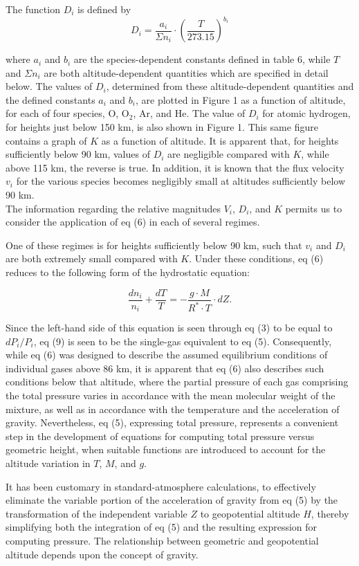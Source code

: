 \documentclass{article}
\begin{document}
The function $D_i$ is defined by
\[
D_i = \frac{a_i}{\Sigma n_i} \cdot \left(\frac{T}{273.15}\right)^{b_i} \tag{8}
\]

where $a_i$ and $b_i$ are the species-dependent constants defined in table 6, while $T$ and $\Sigma n_i$ are both altitude-dependent quantities which are specified in detail below. The values of $D_i$, determined from these altitude-dependent quantities and the defined constants $a_i$ and $b_i$, are plotted in Figure 1 as a function of altitude, for each of four species, O, O$_2$, Ar, and He. The value of $D_i$ for atomic hydrogen, for heights just below 150 km, is also shown in Figure 1. This same figure contains a graph of $K$ as a function of altitude. It is apparent that, for heights sufficiently below 90 km, values of $D_i$ are negligible compared with $K$, while above 115 km, the reverse is true. In addition, it is known that the flux velocity $v_i$ for the various species becomes negligibly small at altitudes sufficiently below 90 km.\\

The information regarding the relative magnitudes $V_i$, $D_i$, and $K$ permits us to consider the application of eq (6) in each of several regimes.

One of these regimes is for heights sufficiently below 90 km, such that $v_i$ and $D_i$ are both extremely small compared with $K$. Under these conditions, eq (6) reduces to the following form of the hydrostatic equation:

\[
\frac{d n_i}{n_i} + \frac{dT}{T} = -\frac{g \cdot M}{R^* \cdot T} \cdot dZ. \tag{9}
\]

Since the left-hand side of this equation is seen through eq (3) to be equal to $dP_i / P_i$, eq (9) is seen to be the single-gas equivalent to eq (5). Consequently, while eq (6) was designed to describe the assumed equilibrium conditions of individual gases above 86 km, it is apparent that eq (6) also describes such conditions below that altitude, where the partial pressure of each gas comprising the total pressure varies in accordance with the mean molecular weight of the mixture, as well as in accordance with the temperature and the acceleration of gravity. Nevertheless, eq (5), expressing total pressure, represents a convenient step in the development of equations for computing total pressure versus geometric height, when suitable functions are introduced to account for the altitude variation in $T$, $M$, and $g$.

It has been customary in standard-atmosphere calculations, to effectively eliminate the variable portion of the acceleration of gravity from eq (5) by the transformation of the independent variable $Z$ to geopotential altitude $H$, thereby simplifying both the integration of eq (5) and the resulting expression for computing pressure. The relationship between geometric and geopotential altitude depends upon the concept of gravity.
\end{document}
